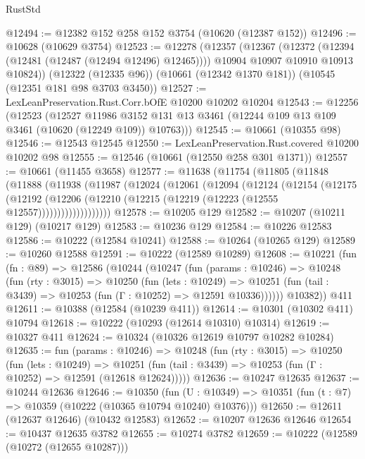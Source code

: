 \begin{lexlean}{RustStd}
\begin{coremodule}
@12494 := @12382 @152 @258 @152 @3754 (@10620 (@12387 @152))
@12496 := @10628 (@10629 @3754)
@12523 := @12278
    (@12357
      (@12367
        (@12372 (@12394 (@12481 (@12487 (@12494 @12496) @12465))))
        @10904
        @10907
        @10910
        @10913
        @10824))
    (@12322 (@12335 @96))
    (@10661 (@12342 @1370 @181))
    (@10545 (@12351 @181 @98 @3703 @3450))
@12527 := LexLeanPreservation.Rust.Corr.bOfE @10200 @10202 @10204
@12543 := @12256
    (@12523
      (@12527
        @11986
        @3152
        @131
        @13
        @3461
        (@12244 @109 @13 @109 @3461 (@10620 (@12249 @109)) @10763)))
@12545 := @10661 (@10355 @98)
@12546 := @12543 @12545
@12550 := LexLeanPreservation.Rust.covered @10200 @10202 @98
@12555 := @12546 (@10661 (@12550 @258 @301 @1371))
@12557 := @10661 (@11455 @3658)
@12577 := @11638
    (@11754
      (@11805
        (@11848
          (@11888
            (@11938
              (@11987
                (@12024
                  (@12061
                    (@12094
                      (@12124
                        (@12154
                          (@12175
                            (@12192
                              (@12206
                                (@12210 (@12215 (@12219 (@12223 (@12555 @12557)))))))))))))))))))
@12578 := @10205 @129
@12582 := @10207 (@10211 @129) (@10217 @129)
@12583 := @10236 @129
@12584 := @10226 @12583
@12586 := @10222 (@12584 @10241)
@12588 := @10264 (@10265 @129)
@12589 := @10260 @12588
@12591 := @10222 (@12589 @10289)
@12608 := @10221
    (fun (fn : @89) =>
    @12586
      (@10244
        (@10247
          (fun (params : @10246) =>
          @10248
            (fun (rty : @3015) =>
            @10250
              (fun (lets : @10249) =>
              @10251 (fun (tail : @3439) => @10253 (fun (Γ : @10252) => @12591 @10336))))))
        @10382))
    @411
@12611 := @10388 (@12584 (@10239 @411))
@12614 := @10301 (@10302 @411) @10794
@12618 := @10222 (@10293 (@12614 @10310) @10314)
@12619 := @10327 @411
@12624 := @10324 (@10326 @12619 @10797 @10282 @10284)
@12635 := fun (params : @10246) =>
  @10248
    (fun (rty : @3015) =>
    @10250
      (fun (lets : @10249) =>
      @10251 (fun (tail : @3439) => @10253 (fun (Γ : @10252) => @12591 (@12618 @12624)))))
@12636 := @10247 @12635
@12637 := @10244 @12636
@12646 := @10350
    (fun (U : @10349) => @10351 (fun (t : @7) => @10359 (@10222 (@10365 @10794 @10240) @10376)))
@12650 := @12611 (@12637 @12646) (@10432 @12583)
@12652 := @10207 @12636 @12646
@12654 := @10437 @12635 @3782
@12655 := @10274 @3782
@12659 := @10222 (@12589 (@10272 (@12655 @10287)))

\end{coremodule}
\end{lexlean}
